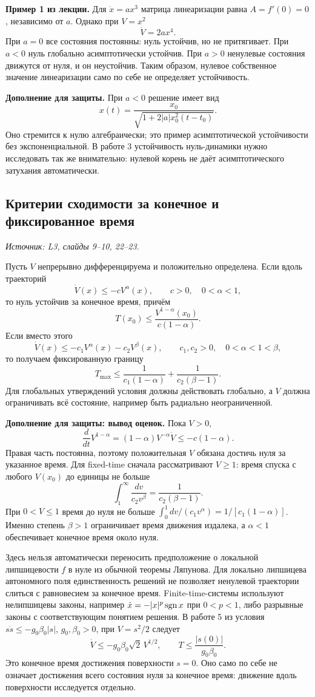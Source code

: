 \textbf{Пример 1 из лекции.}
Для $\dot x=ax^3$ матрица линеаризации равна
$A=f'(0)=0$, независимо от $a$. Однако при $V=x^2$
\[
 \dot V=2ax^4.
\]
При $a=0$ все состояния постоянны: нуль устойчив, но не притягивает.
При $a<0$ нуль глобально асимптотически устойчив.
При $a>0$ ненулевые состояния движутся от нуля, и он неустойчив.
Таким образом, нулевое собственное значение линеаризации
само по себе не определяет устойчивость.

\textbf{Дополнение для защиты.}
При $a<0$ решение имеет вид
\[
 x(t)=\frac{x_0}{\sqrt{1+2|a|x_0^2(t-t_0)}}.
\]
Оно стремится к нулю алгебраически; это пример асимптотической
устойчивости без экспоненциальной.
В работе 3 устойчивость нуль-динамики нужно исследовать так же
внимательно: нулевой корень не даёт асимптотического затухания
автоматически.

\subsection{Критерии сходимости за конечное и фиксированное время}
\label{subsec:stability-finite-fixed}
\noindent\textit{Источник: L3, слайды 9--10, 22--23.}

Пусть $V$ непрерывно дифференцируема и положительно определена.
Если вдоль траекторий
\[
 \dot V(x)\le-cV^\alpha(x),\qquad c>0,\quad0<\alpha<1,
\]
то нуль устойчив за конечное время, причём
\[
 T(x_0)\le\frac{V^{1-\alpha}(x_0)}{c(1-\alpha)}.
\]
Если вместо этого
\[
 \dot V(x)\le-c_1V^\alpha(x)-c_2V^\beta(x),\qquad
 c_1,c_2>0,\quad0<\alpha<1<\beta,
\]
то получаем фиксированную границу
\[
 T_{\max}\le\frac{1}{c_1(1-\alpha)}
                +\frac{1}{c_2(\beta-1)}.
\]
Для глобальных утверждений условия должны действовать глобально,
а $V$ должна ограничивать всё состояние, например быть радиально
неограниченной.

\textbf{Дополнение для защиты: вывод оценок.}
Пока $V>0$,
\[
 \frac{d}{dt}V^{1-\alpha}
 =(1-\alpha)V^{-\alpha}\dot V\le-c(1-\alpha).
\]
Правая часть постоянна, поэтому положительная $V$ обязана
достичь нуля за указанное время. Для fixed-time сначала
рассматривают $V\ge1$: время спуска с любого $V(x_0)$ до единицы
не больше
\[
 \int_1^\infty\frac{dv}{c_2v^\beta}
 =\frac{1}{c_2(\beta-1)}.
\]
При $0<V\le1$ время до нуля не больше
$\int_0^1dv/(c_1v^\alpha)=1/[c_1(1-\alpha)]$.
Именно степень $\beta>1$ ограничивает время движения издалека,
а $\alpha<1$ обеспечивает конечное время около нуля.

Здесь нельзя автоматически переносить предположение о локальной
липшицевости $f$ в нуле из обычной теоремы Ляпунова.
Для локально липшицева автономного поля единственность решений
не позволяет ненулевой траектории слиться с равновесием за
конечное время. Finite-time-системы используют нелипшицевы
законы, например $\dot x=-|x|^p\operatorname{sgn} x$ при $0<p<1$,
либо разрывные законы с соответствующим понятием решения.
В работе 5 из условия $s\dot s\le-g_0\beta_0|s|$,
$g_0,\beta_0>0$, при $V=s^2/2$ следует
\[
 \dot V\le-g_0\beta_0\sqrt{2}\,V^{1/2},\qquad
 T\le\frac{|s(0)|}{g_0\beta_0}.
\]
Это конечное время достижения поверхности $s=0$.
Оно само по себе не означает достижения всего состояния нуля
за конечное время: движение вдоль поверхности исследуется отдельно.

